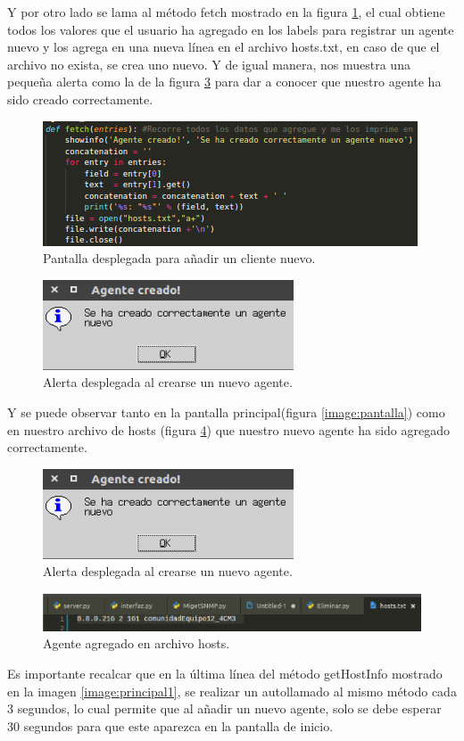 Y por otro lado se lama al método fetch mostrado en la figura \ref{image:add3}, el cual obtiene todos los valores que el usuario ha agregado en los labels para registrar un agente nuevo y los agrega en una nueva línea en el archivo hosts.txt, en caso de que el archivo no exista, se crea uno nuevo. Y de igual manera, nos muestra una pequeña alerta como la de la figura \ref{image:alerta} para dar a conocer que nuestro agente ha sido creado correctamente.
\FloatBarrier
\begin{figure}[htbp!]
		\centering
	\includegraphics[width=.6 \textwidth]{images/add3}
		\caption{Pantalla desplegada para añadir un cliente nuevo.}		\label{image:add3}
\end{figure}
\FloatBarrier

\FloatBarrier
\begin{figure}[htbp!]
		\centering
	\includegraphics[width=.4 \textwidth]{images/addAlerta}
		\caption{Alerta desplegada al crearse un nuevo agente.}		\label{image:alerta}
\end{figure}
\FloatBarrier

Y se puede observar tanto en la pantalla principal(figura \ref{image:pantalla}) como en nuestro archivo de hosts (figura \ref{image:agenteAgregado}) que nuestro nuevo agente ha sido agregado correctamente.

\FloatBarrier
\begin{figure}[htbp!]
		\centering
	\includegraphics[width=.4 \textwidth]{images/addAlerta}
		\caption{Alerta desplegada al crearse un nuevo agente.}		\label{image:alerta}
\end{figure}
\FloatBarrier

\FloatBarrier
\begin{figure}[htbp!]
		\centering
	\includegraphics[width=.4 \textwidth]{images/agenteAgregado}
		\caption{Agente agregado en archivo hosts.}		\label{image:agenteAgregado}
\end{figure}
\FloatBarrier

Es importante recalcar que en la última línea del método getHostInfo mostrado en la imagen \ref{image:principal1}, se realizar un autollamado al mismo método cada 3 segundos, lo cual permite que al añadir un nuevo agente, solo se debe esperar 30 segundos para que este aparezca en la pantalla de inicio.